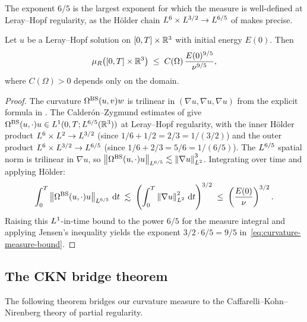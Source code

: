 The exponent $6/5$ is the largest exponent for which the measure is well-defined at
Leray--Hopf regularity, as the H\"{o}lder chain
$L^{6}\times L^{3/2}\to L^{6/5}$ of  makes precise.

\begin{theorem}\label{thm:curvature-measure-finite}
  Let $u$ be a Leray--Hopf solution on $[0,T] \times \mathbb{R}^3$ with initial energy $E(0)$.
  Then
  \begin{equation}\label{eq:curvature-measure-bound}
    \mu_R\bigl([0,T]\times\mathbb{R}^3\bigr)
    \;\leq\;
    C(\Omega)\,\frac{E(0)^{9/5}}{\nu^{9/5}},
  \end{equation}
  where $C(\Omega) > 0$ depends only on the domain.
\end{theorem}

\begin{proof}
  The curvature $\Omega^{\mathrm{BS}}(u,v)w$ is trilinear in $(\nabla u, \nabla u, \nabla u)$
  from the explicit formula in .
  The Calder\'{o}n--Zygmund estimates of 
  give $\Omega^{\mathrm{BS}}(u,\cdot)u \in L^{1}(0,T;L^{6/5}(\mathbb{R}^3))$ at Leray--Hopf regularity,
  with the inner H\"{o}lder product $L^{6}\times L^{2} \to L^{3/2}$
  (since $1/6 + 1/2 = 2/3 = 1/(3/2)$) and the outer product $L^{6}\times L^{3/2}\to L^{6/5}$
  (since $1/6 + 2/3 = 5/6 = 1/(6/5)$).
  The $L^{6/5}$ spatial norm is trilinear in $\nabla u$, so
  $\left\lVert \Omega^{\mathrm{BS}}(u,\cdot)u \right\rVert_{L^{6/5}} \lesssim \left\lVert \nabla u \right\rVert^3_{L^{2}}$.
  Integrating over time and applying H\"{o}lder:
  \[
    \int_0^T \left\lVert \Omega^{\mathrm{BS}}(u,\cdot)u \right\rVert_{L^{6/5}} \,\mathrm{d} t
    \;\lesssim\;
    \left(\int_0^T \left\lVert \nabla u \right\rVert^2_{L^{2}}\,\mathrm{d} t\right)^{3/2}
    \;\leq\;
    \left(\frac{E(0)}{\nu}\right)^{3/2}.
  \]
  Raising this $L^{1}$-in-time bound to the power $6/5$ for the measure integral
  and applying Jensen's inequality yields the exponent $3/2 \cdot 6/5 = 9/5$
  in~\eqref{eq:curvature-measure-bound}.
\end{proof}

\subsection{The CKN bridge theorem}

The following theorem bridges our curvature measure to the Caffarelli--Kohn--Nirenberg
theory of partial regularity.


